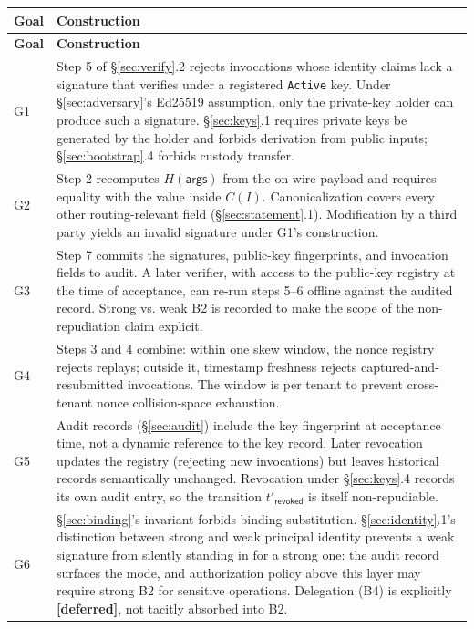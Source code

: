 \documentclass[11pt,a4paper]{article}
\newcommand{\deferred}{\textcolor{deferredcolor}{\textbf{[deferred]}}\xspace}
\begin{document}
\begin{center}
\renewcommand{\arraystretch}{1.3}
\begin{xltabular}{\linewidth}{l X}
\toprule
\textbf{Goal} & \textbf{Construction} \\
\midrule
\endfirsthead
\toprule
\textbf{Goal} & \textbf{Construction} \\
\midrule
\endhead

G1 & Step 5 of \S\ref{sec:verify}.2 rejects invocations whose
identity claims lack a signature that verifies under a registered
\texttt{Active} key. Under \S\ref{sec:adversary}'s Ed25519 assumption,
only the private-key holder can produce such a signature.
\S\ref{sec:keys}.1 requires private keys be generated by the holder
and forbids derivation from public inputs; \S\ref{sec:bootstrap}.4
forbids custody transfer. \\

G2 & Step 2 recomputes $H(\mathsf{args})$ from the on-wire payload
and requires equality with the value inside $C(I)$. Canonicalization
covers every other routing-relevant field (\S\ref{sec:statement}.1).
Modification by a third party yields an invalid signature under G1's
construction. \\

G3 & Step 7 commits the signatures, public-key fingerprints, and
invocation fields to audit. A later verifier, with access to the
public-key registry at the time of acceptance, can re-run steps
5--6 offline against the audited record. Strong vs. weak B2 is
recorded to make the scope of the non-repudiation claim explicit. \\

G4 & Steps 3 and 4 combine: within one skew window, the nonce
registry rejects replays; outside it, timestamp freshness rejects
captured-and-resubmitted invocations. The window is per tenant to
prevent cross-tenant nonce collision-space exhaustion. \\

G5 & Audit records (\S\ref{sec:audit}) include the key fingerprint at
acceptance time, not a dynamic reference to the key record. Later
revocation updates the registry (rejecting new invocations) but leaves
historical records semantically unchanged. Revocation under
\S\ref{sec:keys}.4 records its own audit entry, so the transition
$t'_{\mathsf{revoked}}$ is itself non-repudiable. \\

G6 & \S\ref{sec:binding}'s invariant forbids binding substitution.
\S\ref{sec:identity}.1's distinction between strong and weak
principal identity prevents a weak signature from silently standing
in for a strong one: the audit record surfaces the mode, and
authorization policy above this layer may require strong B2 for
sensitive operations. Delegation (B4) is explicitly \deferred, not
tacitly absorbed into B2. \\

\bottomrule
\end{xltabular}
\end{center}
\end{document}
